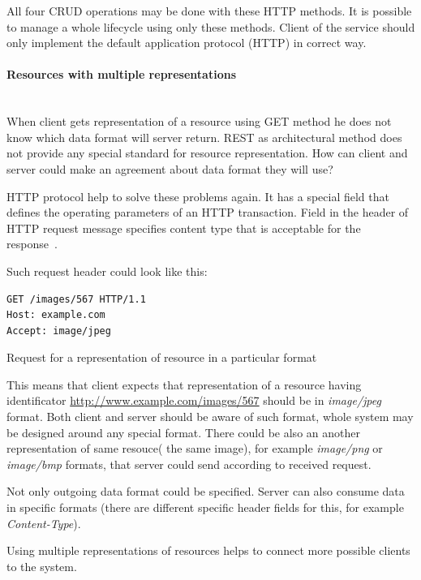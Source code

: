 All four \gls{CRUD} operations may be done with these HTTP methods. It is
possible to manage a whole lifecycle using only these methods. Client of the
service should only implement   the default application protocol (HTTP)
in correct way.

\paragraph{Resources with multiple representations} ~\\

When client gets representation of a resource using GET method he does not know
which data format will server return. REST as architectural method does not
provide any special standard for resource representation. How can client and
server could make an agreement about data format they will use?


HTTP protocol help to solve these problems again. 
It has a special field that defines the operating parameters of an HTTP
transaction. Field  in the header of HTTP request message
specifies content type that is acceptable for the response~\cite{http-rfc}.

Such request header could look like this:

\begin{listing}[H]
\begin{verbatim}
GET /images/567 HTTP/1.1
Host: example.com
Accept: image/jpeg
\end{verbatim}
\caption{Request for a representation of resource in a particular format}
\label{lst:http_accept_example}
\end{listing}

This means that client expects that representation of a resource having
identificator \url{http://www.example.com/images/567} should be in
\textit{image/jpeg} format. Both client and server should be aware of such
format, whole system may be designed around any special format. 
There could be also an another representation of same resouce( the same image),
for example \textit{image/png} or \textit{image/bmp} formats, that server could
send according to received request. 

Not only outgoing data format could be specified. Server can also consume data
in specific formats (there are different specific header fields for this, for
example \textit{Content-Type}).

Using multiple representations of resources helps to connect more possible
clients to the system.

